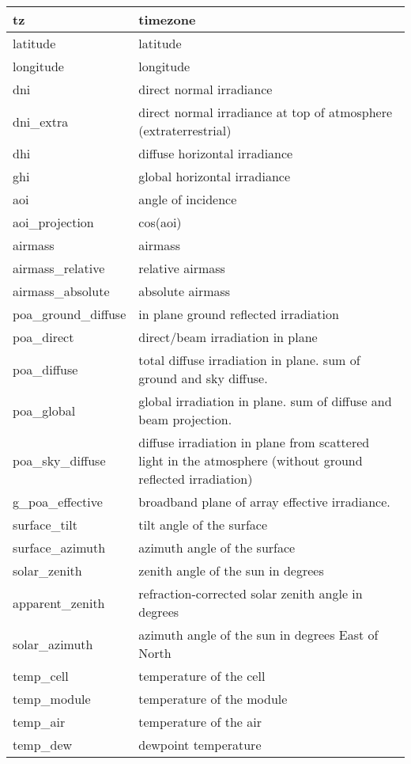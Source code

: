 \documentclass[letterpaper,10pt,english]{sphinxmanual}
\begin{document}
\begin{longtable}{|l|l|}
tz
&
timezone
\\
\hline
latitude
&
latitude
\\
\hline
longitude
&
longitude
\\
\hline
dni
&
direct normal irradiance
\\
\hline
dni\_extra
&
direct normal irradiance at top of atmosphere (extraterrestrial)
\\
\hline
dhi
&
diffuse horizontal irradiance
\\
\hline
ghi
&
global horizontal irradiance
\\
\hline
aoi
&
angle of incidence
\\
\hline
aoi\_projection
&
cos(aoi)
\\
\hline
airmass
&
airmass
\\
\hline
airmass\_relative
&
relative airmass
\\
\hline
airmass\_absolute
&
absolute airmass
\\
\hline
poa\_ground\_diffuse
&
in plane ground reflected irradiation
\\
\hline
poa\_direct
&
direct/beam irradiation in plane
\\
\hline
poa\_diffuse
&
total diffuse irradiation in plane. sum of ground and sky diffuse.
\\
\hline
poa\_global
&
global irradiation in plane. sum of diffuse and beam projection.
\\
\hline
poa\_sky\_diffuse
&
diffuse irradiation in plane from scattered light in the atmosphere (without ground reflected irradiation)
\\
\hline
g\_poa\_effective
&
broadband plane of array effective irradiance.
\\
\hline
surface\_tilt
&
tilt angle of the surface
\\
\hline
surface\_azimuth
&
azimuth angle of the surface
\\
\hline
solar\_zenith
&
zenith angle of the sun in degrees
\\
\hline
apparent\_zenith
&
refraction-corrected solar zenith angle in degrees
\\
\hline
solar\_azimuth
&
azimuth angle of the sun in degrees East of North
\\
\hline
temp\_cell
&
temperature of the cell
\\
\hline
temp\_module
&
temperature of the module
\\
\hline
temp\_air
&
temperature of the air
\\
\hline
temp\_dew
&
dewpoint temperature
\\

\end{longtable}
\end{document}

